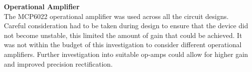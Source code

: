 \textbf{Operational Amplifier}\\
The MCP6022 operational amplifier was used across all the circuit designs. Careful consideration had to be taken during design to ensure that the device did not become unstable, this limited the amount of gain that could be achieved. It was not within the budget of this investigation to consider different operational amplifiers. Further investigation into suitable op-amps could allow for higher gain and improved precision rectification.













